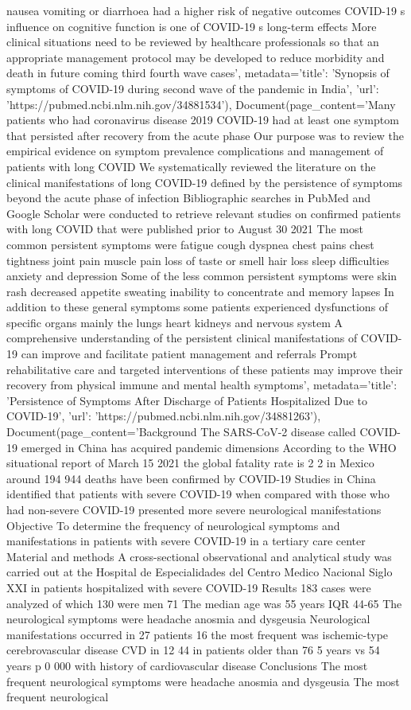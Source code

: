 nausea vomiting or diarrhoea had a higher risk of negative outcomes COVID-19 s influence on cognitive function is one of COVID-19 s long-term effects More clinical situations need to be reviewed by healthcare professionals so that an appropriate management protocol may be developed to reduce morbidity and death in future coming third fourth wave cases', metadata={'title': 'Synopsis of symptoms of COVID-19 during second wave of the pandemic in India', 'url': 'https://pubmed.ncbi.nlm.nih.gov/34881534'}), Document(page\_content='Many patients who had coronavirus disease 2019 COVID-19 had at least one symptom that persisted after recovery from the acute phase Our purpose was to review the empirical evidence on symptom prevalence complications and management of patients with long COVID We systematically reviewed the literature on the clinical manifestations of long COVID-19 defined by the persistence of symptoms beyond the acute phase of infection Bibliographic searches in PubMed and Google Scholar were conducted to retrieve relevant studies on confirmed patients with long COVID that were published prior to August 30 2021 The most common persistent symptoms were fatigue cough dyspnea chest pains chest tightness joint pain muscle pain loss of taste or smell hair loss sleep difficulties anxiety and depression Some of the less common persistent symptoms were skin rash decreased appetite sweating inability to concentrate and memory lapses In addition to these general symptoms some patients experienced dysfunctions of specific organs mainly the lungs heart kidneys and nervous system A comprehensive understanding of the persistent clinical manifestations of COVID-19 can improve and facilitate patient management and referrals Prompt rehabilitative care and targeted interventions of these patients may improve their recovery from physical immune and mental health symptoms', metadata={'title': 'Persistence of Symptoms After Discharge of Patients Hospitalized Due to COVID-19', 'url': 'https://pubmed.ncbi.nlm.nih.gov/34881263'}), Document(page\_content='Background The SARS-CoV-2 disease called COVID-19 emerged in China has acquired pandemic dimensions According to the WHO situational report of March 15 2021 the global fatality rate is 2 2 in Mexico around 194 944 deaths have been confirmed by COVID-19 Studies in China identified that patients with severe COVID-19 when compared with those who had non-severe COVID-19 presented more severe neurological manifestations Objective To determine the frequency of neurological symptoms and manifestations in patients with severe COVID-19 in a tertiary care center Material and methods A cross-sectional observational and analytical study was carried out at the Hospital de Especialidades del Centro Medico Nacional Siglo XXI in patients hospitalized with severe COVID-19 Results 183 cases were analyzed of which 130 were men 71 The median age was 55 years IQR 44-65 The neurological symptoms were headache anosmia and dysgeusia Neurological manifestations occurred in 27 patients 16 the most frequent was ischemic-type cerebrovascular disease CVD in 12 44 in patients older than 76 5 years vs 54 years p 0 000 with history of cardiovascular disease Conclusions The most frequent neurological symptoms were headache anosmia and dysgeusia The most frequent neurological 